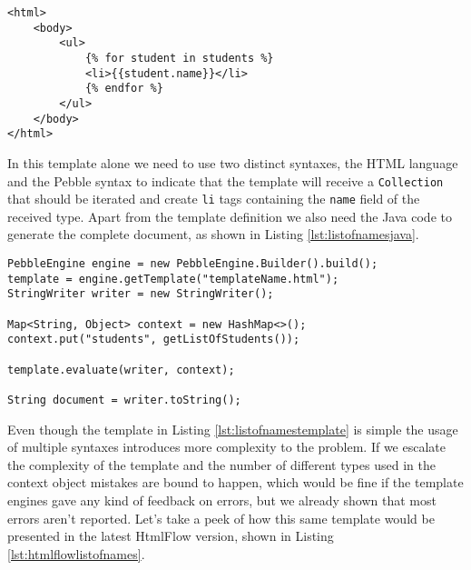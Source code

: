 \bigskip


\begin{minipage}{\linewidth}
\begin{lstlisting}[caption={List of Student Names Template - Pebble}, label={lst:listofnamestemplate}]
<html>
	<body>
	    <ul>
			{% for student in students %}
		  	<li>{{student.name}}</li>
			{% endfor %}
		</ul>  
  	</body>
</html>
\end{lstlisting}
\end{minipage} 

\noindent
In this template alone we need to use two distinct syntaxes, the \ac{HTML} language and the Pebble syntax to indicate that the template will receive a \texttt{Collection} that should be iterated  and create \texttt{li} tags containing the \texttt{name} field of the received type. Apart from the template definition we also need the Java code to generate the complete document, as shown in Listing \ref{lst:listofnamesjava}.

\bigskip


\begin{minipage}{\linewidth}
\begin{lstlisting}[caption={List of Student Names Java - Pebble}, label={lst:listofnamesjava}]
PebbleEngine engine = new PebbleEngine.Builder().build();
template = engine.getTemplate("templateName.html");
StringWriter writer = new StringWriter();

Map<String, Object> context = new HashMap<>();
context.put("students", getListOfStudents());

template.evaluate(writer, context);

String document = writer.toString();
\end{lstlisting}
\end{minipage} 

\noindent
Even though the template in Listing \ref{lst:listofnamestemplate} is simple the usage of multiple syntaxes introduces more complexity to the problem. If we escalate the complexity of the template and the number of different types used in the context object mistakes are bound to happen, which would be fine if the template engines gave any kind of feedback on errors, but we already shown that most errors aren't reported. Let's take a peek of how this same template would be presented in the latest HtmlFlow version, shown in Listing \ref{lst:htmlflowlistofnames}.

